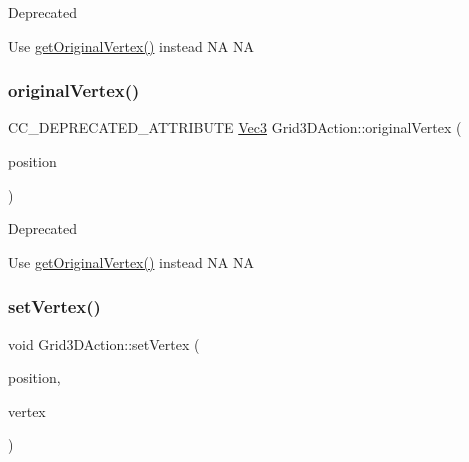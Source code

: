 \begin{DoxyRefDesc}{Deprecated}
\item[\hyperlink{deprecated__deprecated000008}{Deprecated}]Use \hyperlink{classGrid3DAction_a8e614d5c3c368b1f2eee4a3e885f861f}{get\+Original\+Vertex()} instead  NA  NA \end{DoxyRefDesc}
\mbox{\label{classGrid3DAction_aa9ab3e0d2e07ab0a8227bbbd9c0b2021}} 
\subsubsection{\texorpdfstring{original\+Vertex()}{originalVertex()}\hspace{0.1cm}{\footnotesize\ttfamily [2/2]}}
{\footnotesize\ttfamily C\+C\+\_\+\+D\+E\+P\+R\+E\+C\+A\+T\+E\+D\+\_\+\+A\+T\+T\+R\+I\+B\+U\+TE \hyperlink{classVec3}{Vec3} Grid3\+D\+Action\+::original\+Vertex (\begin{DoxyParamCaption}\item[{const \hyperlink{classVec2}{Vec2} \&}]{position }\end{DoxyParamCaption})\hspace{0.3cm}{\ttfamily [inline]}}

\begin{DoxyRefDesc}{Deprecated}
\item[\hyperlink{deprecated__deprecated000238}{Deprecated}]Use \hyperlink{classGrid3DAction_a8e614d5c3c368b1f2eee4a3e885f861f}{get\+Original\+Vertex()} instead  NA  NA \end{DoxyRefDesc}
\mbox{\label{classGrid3DAction_a110cf4db66e0410d971d9f47e116fdbf}} 
\subsubsection{\texorpdfstring{set\+Vertex()}{setVertex()}\hspace{0.1cm}{\footnotesize\ttfamily [1/2]}}
{\footnotesize\ttfamily void Grid3\+D\+Action\+::set\+Vertex (\begin{DoxyParamCaption}\item[{const \hyperlink{classVec2}{Vec2} \&}]{position,  }\item[{const \hyperlink{classVec3}{Vec3} \&}]{vertex }\end{DoxyParamCaption})}



